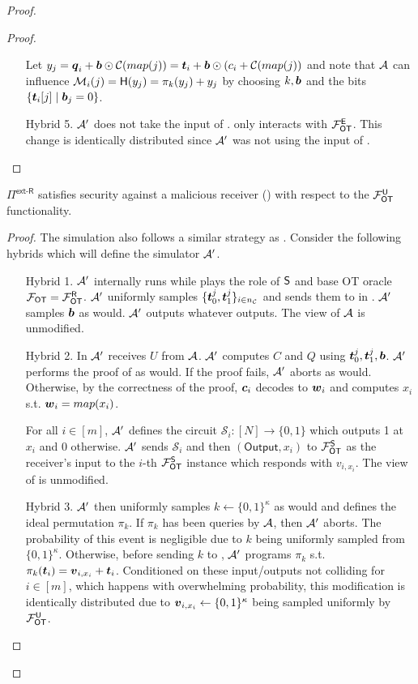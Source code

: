 \begin{proof}
\begin{proof}
\begin{enumerate}[leftmargin=1.8cm]
			Let $y_{j}= \boldsymbol{q}_i+\boldsymbol{b}\odot \mathcal{C}(map(j))=\boldsymbol{t}_i + \boldsymbol{b} \odot (c_i + \mathcal{C}(map(j))$ and note that $\mathcal{A}$ can influence $\mathcal{M}_i(j)=\mathsf{H}(y_j)=\pi_k(y_j)+y_j$ by choosing $k,\boldsymbol{b}$ and the bits $\{\boldsymbol{t}_i[j] \mid \boldsymbol{b}_j=0\}$.
			
			\item[Hybrid 5.] $\mathcal{A}'$ does not take the input of \rec. \rec only interacts with $\mathcal{F}_{\mathsf{OT}}^\mathsf{E}$. This change is identically distributed since $\mathcal{A}'$ was not using the input of \rec.
		\end{enumerate}
		\pe
	\end{proof}
	\begin{claim}\label{claim:ext-R-S-MalReceiver}
		$\Pi^{\textsf{ext-R}}$ satisfies security against a malicious receiver () with respect to the $\mathcal{F}_{\mathsf{OT}}^\mathsf{U}$ functionality.
	\end{claim}
	\begin{proof}
		The simulation also follows a similar strategy as . Consider the following hybrids which will define the simulator $\mathcal{A}'$. 
		\begin{enumerate}[leftmargin=1.8cm]
			\item[Hybrid 1.] $\mathcal{A}'$ internally runs \Adv while plays the role of $\mathsf{S}$ and base OT oracle $\mathcal{F}_{\mathsf{OT}}=\mathcal{F}_{\mathsf{OT}}^\mathsf{R}$. $\mathcal{A}'$ uniformly samples $\{\boldsymbol{t}^j_0,\boldsymbol{t}^j_1\}_{i\in{n_\mathcal{C}}}$ and sends them to \Adv in . $\mathcal{A}'$ samples $\boldsymbol{b}$ as \send would. $\mathcal{A}'$ outputs whatever \Adv outputs. The view of $\mathcal{A}$ is unmodified.
			
			\item[Hybrid 2.] In  $\mathcal{A}'$ receives $U$ from $\mathcal{A}$.  $\mathcal{A}'$ computes $C$ and $Q$ using $\boldsymbol{t}_0^j,\boldsymbol{t}_1^j,\boldsymbol{b}$. $\mathcal{A}'$ performs the proof of  as \send would. If the proof fails, $\mathcal{A}'$ aborts as \send would. Otherwise, by the correctness of the proof, $\boldsymbol{c}_i$ decodes to $\boldsymbol{w}_i$ and computes $x_i$ s.t. $\boldsymbol{w}_i=map(x_i)$. 
			
			For all $i\in[m]$, $\mathcal{A}'$ defines the circuit $\mathcal{S}_i:[N]\rightarrow\{0,1\}$ which outputs 1 at $x_i$ and 0 otherwise. $\mathcal{A}'$ sends $\mathcal{S}_i$ and then $(\textsf{Output}, x_i)$ to $\mathcal{F}_{\mathsf{OT}}^\mathsf{S}$ as the receiver's input to the $i$-th  $\mathcal{F}_{\mathsf{OT}}^\mathsf{S}$ instance which responds with $v_{i,x_i}$. The view of \Adv is unmodified.
			
			
			\item[Hybrid 3.] $\mathcal{A}'$ then uniformly samples $k\gets\{0,1\}^\kappa$ as \send would and defines the ideal permutation $\pi_k$. If $\pi_k$ has been queries by $\mathcal{A}$, then $\mathcal{A}'$ aborts. The probability of this event is negligible due to $k$ being uniformly sampled from $\{0,1\}^\kappa$. Otherwise, before sending $k$ to \send, $\mathcal{A}'$ programs $\pi_k$ s.t.  $\pi_k(\boldsymbol{t}_i)=\boldsymbol{v}_{i, x_i}+\boldsymbol{t}_i$. Conditioned on these input/outputs not colliding for $i\in[m]$, which happens with overwhelming probability, this modification is identically distributed due to $\boldsymbol{v}_{i, x_i}\gets\{0,1\}^\kappa$ being sampled uniformly by $\mathcal{F}_{\mathsf{OT}}^\mathsf{U}$.
			

\end{enumerate}
\end{proof}
\end{proof}
